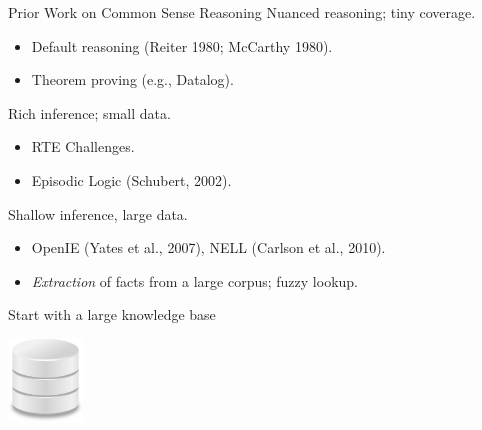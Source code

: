 \begin{frame}{Prior Work on Common Sense Reasoning}
 Nuanced reasoning; tiny coverage.
\begin{itemize}
  \item Default reasoning (Reiter 1980; McCarthy 1980).
  \item Theorem proving (e.g., Datalog).
\end{itemize}
\vspace{0.5cm}
\pause

 Rich inference; small data.
\begin{itemize}
  \item RTE Challenges.
  \item Episodic Logic (Schubert, 2002).
\end{itemize}
\vspace{0.5cm}
\pause

 Shallow inference, large data.
\begin{itemize}
  \item OpenIE (Yates et al., 2007), NELL (Carlson et al., 2010).
  \item \textit{Extraction} of facts from a large corpus; fuzzy lookup.
\end{itemize}
\end{frame}


\begin{frame}{Start with a large knowledge base}
\begin{center}
  \hspace{0.8cm}
  \includegraphics[height=2.2cm]{../img/database.png}
\end{center}
\end{frame}

